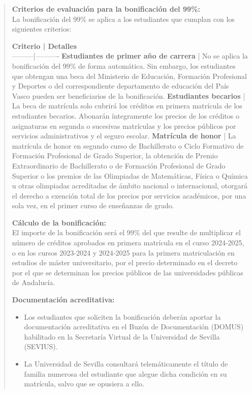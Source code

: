 \documentclass[12pt,a4paper,oneside]{report}
\begin{document}
\begin{itemize}
\begin{itemize}
\begin{quote}
\noindent\textbf{Criterios de evaluación para la bonificación del 99\%:}\\

La bonificación del 99\% se aplica a los estudiantes que cumplan con los siguientes criterios:


\noindent\textbf{Criterio | Detalles}\\
---------|----------
\textbf{Estudiantes de primer año de carrera} | No se aplica la bonificación del 99\% de forma automática. Sin embargo, los estudiantes que obtengan una beca del Ministerio de Educación, Formación Profesional y Deportes o del correspondiente departamento de educación del País Vasco pueden ser beneficiarios de la bonificación.
\textbf{Estudiantes becarios} | La beca de matrícula solo cubrirá los créditos en primera matrícula de los estudiantes becarios. Abonarán íntegramente los precios de los créditos o asignaturas en segunda o sucesivas matrículas y los precios públicos por servicios administrativos y el seguro escolar.
\textbf{Matrícula de honor} | La matrícula de honor en segundo curso de Bachillerato o Ciclo Formativo de Formación Profesional de Grado Superior, la obtención de Premio Extraordinario de Bachillerato o de Formación Profesional de Grado Superior o los premios de las Olimpiadas de Matemáticas, Física o Química u otras olimpiadas acreditadas de ámbito nacional o internacional, otorgará el derecho a exención total de los precios por servicios académicos, por una sola vez, en el primer curso de enseñanzas de grado.


\noindent\textbf{Cálculo de la bonificación:}\\

El importe de la bonificación será el 99\% del que resulte de multiplicar el número de créditos aprobados en primera matrícula en el curso 2024-2025, o en los cursos 2023-2024 y 2024-2025 para la primera matriculación en estudios de máster universitario, por el precio determinado en el decreto por el que se determinan los precios públicos de las universidades públicas de Andalucía.


\noindent\textbf{Documentación acreditativa:}\\

\begin{itemize}
  \item Los estudiantes que soliciten la bonificación deberán aportar la documentación acreditativa en el Buzón de Documentación (DOMUS) habilitado en la Secretaría Virtual de la Universidad de Sevilla (SEVIUS).
  \item La Universidad de Sevilla consultará telemáticamente el título de familia numerosa del estudiante que alegue dicha condición en su matrícula, salvo que se opusiera a ello.
\end{itemize}



\end{quote}
\end{itemize}
\end{itemize}
\end{document}
